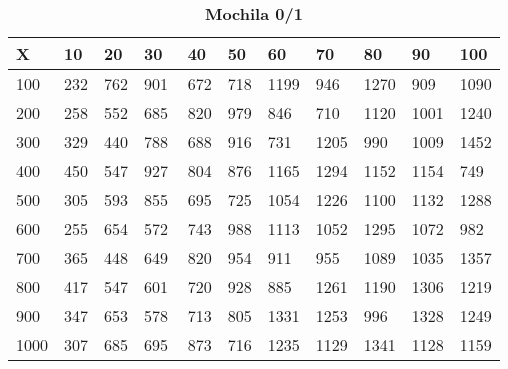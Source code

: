 \documentclass[10pt,letterpaper]{article}
\begin{document}
\newpage 
{}
\begin{center}
\begin{table}\renewcommand{\arraystretch}{2.5}
\caption{\large \textbf{Mochila 0/1}}
\centering
\begin{tabular} { |m{0.5cm}|m{1.3cm}|m{1.3cm}|m{1.3cm}|m{1.3cm}|m{1.3cm}|m{1.3cm}|m{1.3cm}|m{1.3cm}|m{1.3cm}|m{1.3cm}|} 
\hline
\rowcolor{Gray}
\centering \textbf{X} & \centering \textbf{10} & \centering \textbf{20} & \centering \textbf{30}\ & \centering \textbf{40} & \centering \textbf{50} & \centering \textbf{60}\ & \centering \textbf{70} & \centering \textbf{80} & \centering \textbf{90}\ & \textbf{100} \\\hline
\cellcolor{Gray}100 & \Large 232 & \Large 762 & \Large 901 & \Large 672 & \Large 718 & \Large 1199 & \Large 946 & \Large 1270 & \Large 909 & \Large 1090 \\
\hline
\cellcolor{Gray}200 & \Large 258 & \Large 552 & \Large 685 & \Large 820 & \Large 979 & \Large 846 & \Large 710 & \Large 1120 & \Large 1001 & \Large 1240 \\
\hline
\cellcolor{Gray}300 & \Large 329 & \Large 440 & \Large 788 & \Large 688 & \Large 916 & \Large 731 & \Large 1205 & \Large 990 & \Large 1009 & \Large 1452 \\
\hline
\cellcolor{Gray}400 & \Large 450 & \Large 547 & \Large 927 & \Large 804 & \Large 876 & \Large 1165 & \Large 1294 & \Large 1152 & \Large 1154 & \Large 749 \\
\hline
\cellcolor{Gray}500 & \Large 305 & \Large 593 & \Large 855 & \Large 695 & \Large 725 & \Large 1054 & \Large 1226 & \Large 1100 & \Large 1132 & \Large 1288 \\
\hline
\cellcolor{Gray}600 & \Large 255 & \Large 654 & \Large 572 & \Large 743 & \Large 988 & \Large 1113 & \Large 1052 & \Large 1295 & \Large 1072 & \Large 982 \\
\hline
\cellcolor{Gray}700 & \Large 365 & \Large 448 & \Large 649 & \Large 820 & \Large 954 & \Large 911 & \Large 955 & \Large 1089 & \Large 1035 & \Large 1357 \\
\hline
\cellcolor{Gray}800 & \Large 417 & \Large 547 & \Large 601 & \Large 720 & \Large 928 & \Large 885 & \Large 1261 & \Large 1190 & \Large 1306 & \Large 1219 \\
\hline
\cellcolor{Gray}900 & \Large 347 & \Large 653 & \Large 578 & \Large 713 & \Large 805 & \Large 1331 & \Large 1253 & \Large 996 & \Large 1328 & \Large 1249 \\
\hline
\cellcolor{Gray}1000 & \Large 307 & \Large 685 & \Large 695 & \Large 873 & \Large 716 & \Large 1235 & \Large 1129 & \Large 1341 & \Large 1128 & \Large 1159 \\
\hline
\end{tabular} \\
\end{table}
\end{center}
\end{document}
